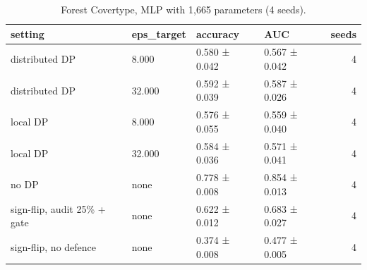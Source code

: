 \begin{table}
\caption{Forest Covertype, MLP with 1,665 parameters (4 seeds).}
\label{tab:T07_second_dataset}
\begin{tabular}{llllr}
\toprule
setting & eps\_target & accuracy & AUC & seeds \\
\midrule
distributed DP & 8.000 & 0.580 ± 0.042 & 0.567 ± 0.042 & 4 \\
distributed DP & 32.000 & 0.592 ± 0.039 & 0.587 ± 0.026 & 4 \\
local DP & 8.000 & 0.576 ± 0.055 & 0.559 ± 0.040 & 4 \\
local DP & 32.000 & 0.584 ± 0.036 & 0.571 ± 0.041 & 4 \\
no DP & none & 0.778 ± 0.008 & 0.854 ± 0.013 & 4 \\
sign-flip, audit 25\% + gate & none & 0.622 ± 0.012 & 0.683 ± 0.027 & 4 \\
sign-flip, no defence & none & 0.374 ± 0.008 & 0.477 ± 0.005 & 4 \\
\bottomrule
\end{tabular}
\end{table}
